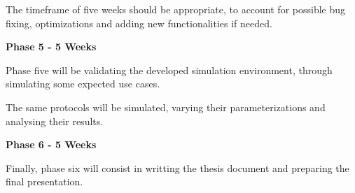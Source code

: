 The timeframe of five weeks should be appropriate, to account for possible bug fixing, optimizations and adding new functionalities if needed.

\vspace{0.25cm}

\textbf{Phase 5 - 5 Weeks}

Phase five will be validating the developed simulation environment, through simulating some expected use cases.

The same protocols will be simulated, varying their parameterizations and analysing their results.

\vspace{0.25cm}

\textbf{Phase 6 - 5 Weeks}

Finally, phase six will consist in writting the thesis document and preparing the final presentation.


